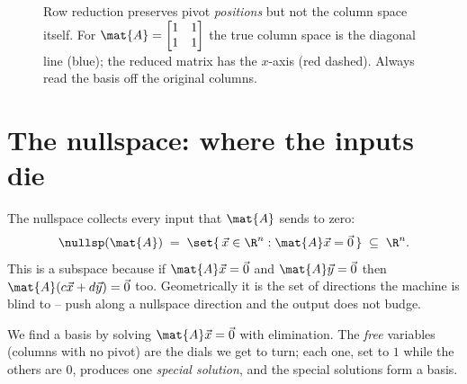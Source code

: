 \begin{figure}[H]
\centering
{}
\caption{Row reduction preserves pivot \emph{positions} but not the column space itself. For
$\mat{A}=\protect\begin{bmatrix}1&1\\1&1\protect\end{bmatrix}$ the true column space is the
diagonal line (blue); the reduced matrix has the $x$-axis (red dashed). Always read the basis
off the original columns.}
\label{ch15:colspace-trap}
\end{figure}

\section{The nullspace: where the inputs die}

The nullspace collects every input that $\mat{A}$ sends to zero:
\[
  \nullsp(\mat{A}) \;=\; \set{\,\vec{x}\in\R^n : \mat{A}\vec{x}=\vec{0}\,} \;\subseteq\; \R^n.
\]
This is a subspace because if $\mat{A}\vec{x}=\vec{0}$ and $\mat{A}\vec{y}=\vec{0}$ then
$\mat{A}(c\vec{x}+d\vec{y})=\vec{0}$ too. Geometrically it is the set of directions the machine
is blind to -- push along a nullspace direction and the output does not budge.

We find a basis by solving $\mat{A}\vec{x}=\vec{0}$ with elimination. The \emph{free} variables
(columns with no pivot) are the dials we get to turn; each one, set to $1$ while the others are
$0$, produces one \emph{special solution}, and the special solutions form a basis.

